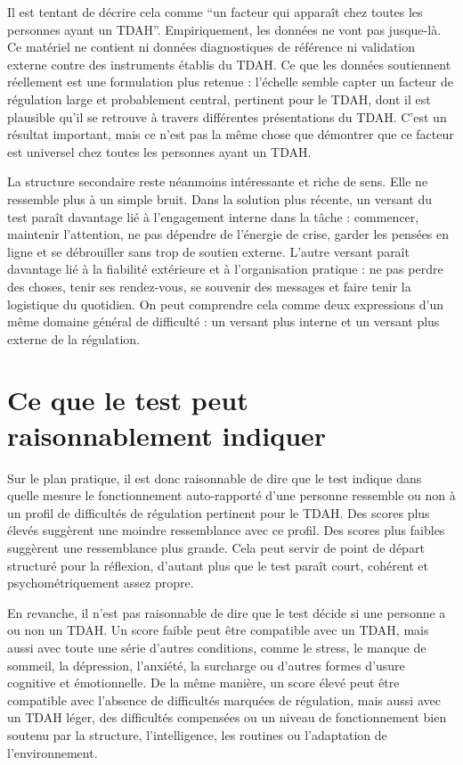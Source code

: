 \documentclass[11pt,a4paper]{article}
\begin{document}
Il est tentant de décrire cela comme ``un facteur qui apparaît chez toutes les personnes ayant un TDAH''. Empiriquement, les données ne vont pas jusque-là. Ce matériel ne contient ni données diagnostiques de référence ni validation externe contre des instruments établis du TDAH. Ce que les données soutiennent réellement est une formulation plus retenue : l’échelle semble capter un facteur de régulation large et probablement central, pertinent pour le TDAH, dont il est plausible qu’il se retrouve à travers différentes présentations du TDAH. C’est un résultat important, mais ce n’est pas la même chose que démontrer que ce facteur est universel chez toutes les personnes ayant un TDAH.

La structure secondaire reste néanmoins intéressante et riche de sens. Elle ne ressemble plus à un simple bruit. Dans la solution plus récente, un versant du test paraît davantage lié à l’engagement interne dans la tâche : commencer, maintenir l’attention, ne pas dépendre de l’énergie de crise, garder les pensées en ligne et se débrouiller sans trop de soutien externe. L’autre versant paraît davantage lié à la fiabilité extérieure et à l’organisation pratique : ne pas perdre des choses, tenir ses rendez-vous, se souvenir des messages et faire tenir la logistique du quotidien. On peut comprendre cela comme deux expressions d’un même domaine général de difficulté : un versant plus interne et un versant plus externe de la régulation.

\section{Ce que le test peut raisonnablement indiquer}
Sur le plan pratique, il est donc raisonnable de dire que le test indique dans quelle mesure le fonctionnement auto-rapporté d’une personne ressemble ou non à un profil de difficultés de régulation pertinent pour le TDAH. Des scores plus élevés suggèrent une moindre ressemblance avec ce profil. Des scores plus faibles suggèrent une ressemblance plus grande. Cela peut servir de point de départ structuré pour la réflexion, d’autant plus que le test paraît court, cohérent et psychométriquement assez propre.

En revanche, il n’est pas raisonnable de dire que le test décide si une personne a ou non un TDAH. Un score faible peut être compatible avec un TDAH, mais aussi avec toute une série d’autres conditions, comme le stress, le manque de sommeil, la dépression, l’anxiété, la surcharge ou d’autres formes d’usure cognitive et émotionnelle. De la même manière, un score élevé peut être compatible avec l’absence de difficultés marquées de régulation, mais aussi avec un TDAH léger, des difficultés compensées ou un niveau de fonctionnement bien soutenu par la structure, l’intelligence, les routines ou l’adaptation de l’environnement.
\end{document}
